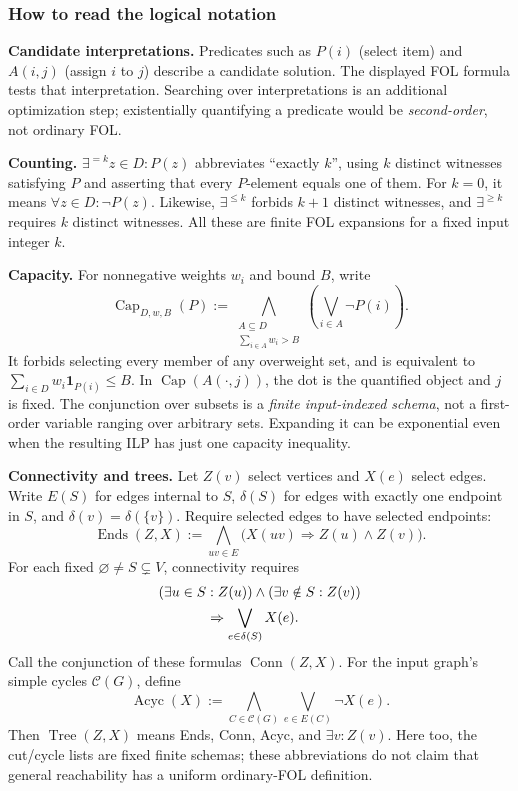 \subsubsection*{How to read the logical notation}
\textbf{Candidate interpretations.} Predicates such as $P(i)$ (select item)
and $A(i,j)$ (assign $i$ to $j$) describe a candidate solution. The displayed
FOL formula tests that interpretation. Searching over interpretations is
an additional optimization step; existentially quantifying a predicate
would be \emph{second-order}, not ordinary FOL.

\textbf{Counting.} $\exists^{=k}z\in D:P(z)$ abbreviates ``exactly $k$'',
using $k$ distinct witnesses satisfying $P$ and asserting that every
$P$-element equals one of them. For $k=0$, it means $\forall z\in D:\neg P(z)$.
Likewise, $\exists^{\le k}$ forbids $k+1$ distinct witnesses, and
$\exists^{\ge k}$ requires $k$ distinct witnesses. All these are finite
FOL expansions for a fixed input integer $k$.

\textbf{Capacity.} For nonnegative weights $w_i$ and bound $B$, write
\[
 \operatorname{Cap}_{D,w,B}(P):=
 \bigwedge_{\substack{A\subseteq D\\\sum_{i\in A}w_i>B}}
       \left(\bigvee_{i\in A}\neg P(i)\right).
\]
It forbids selecting every member of any overweight set, and is equivalent
to $\sum_{i\in D}w_i\mathbf1_{P(i)}\le B$. In $\operatorname{Cap}(A(\cdot,j))$,
the dot is the quantified object and $j$ is fixed.
The conjunction over subsets is a \emph{finite input-indexed schema},
not a first-order variable ranging over arbitrary sets. Expanding it can
be exponential even when the resulting ILP has just one capacity inequality.

\textbf{Connectivity and trees.} Let $Z(v)$ select vertices and $X(e)$
select edges. Write $E(S)$ for edges internal to $S$, $\delta(S)$ for edges
with exactly one endpoint in $S$, and $\delta(v)=\delta(\{v\})$.
Require selected edges to have selected endpoints:
\[
 \operatorname{Ends}(Z,X):=
 \bigwedge_{uv\in E}\bigl(X(uv)\Rightarrow Z(u)\land Z(v)\bigr).
\]
For each fixed $\varnothing\ne S\subsetneq V$, connectivity requires
\[
 \begin{aligned}
 &(\exists u\in S:Z(u))\land(\exists v\notin S:Z(v))\\
 &\hspace{12mm}\Rightarrow\bigvee_{e\in\delta(S)}X(e).
 \end{aligned}
\]
Call the conjunction of these formulas $\operatorname{Conn}(Z,X)$.
For the input graph's simple cycles $\mathcal C(G)$, define
\[
 \operatorname{Acyc}(X):=
 \bigwedge_{C\in\mathcal C(G)}\bigvee_{e\in E(C)}\neg X(e).
\]
Then $\operatorname{Tree}(Z,X)$ means Ends, Conn, Acyc, and
$\exists v:Z(v)$. Here too, the cut/cycle lists are fixed finite schemas;
these abbreviations do not claim that general reachability has a uniform
ordinary-FOL definition.

